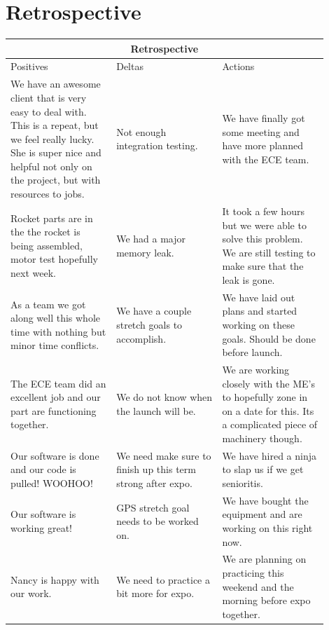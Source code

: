 \documentclass[10pt,draftclsnofoot,onecolumn]{IEEEtran}
\begin{document}
\section{Retrospective}
\begin{tabular}{ |p{0.3\linewidth}|p{0.3\linewidth}|p{0.3\linewidth}| }
\hline
\multicolumn{3}{|c|}{Retrospective} \\
\hline
    Positives & Deltas & Actions \\
\hline
    We have an awesome client that is very easy to deal with. This is a repeat, but we feel really lucky. She is super nice and helpful not only on the project, but with resources to jobs. & Not enough integration testing. & We have finally got some meeting and have more planned with the ECE team. \\
\hline
    Rocket parts are in the the rocket is being assembled, motor test hopefully next week. & We had a major memory leak. & It took a few hours but we were able to solve this problem. We are still testing to make sure that the leak is gone. \\
\hline
As a team we got along well this whole time with nothing but minor time conflicts. & We have a couple stretch goals to accomplish. & We have laid out plans and started working on these goals. Should be done before launch. \\
\hline
The ECE team did an excellent job and our part are functioning together. & We do not know when the launch will be. & We are working closely with the ME's to hopefully zone in on a date for this. Its a complicated piece of machinery though.\\
\hline
Our software is done and our code is pulled! WOOHOO! & We need make sure to finish up this term strong after expo. & We have hired a ninja to slap us if we get senioritis. \\
\hline
Our software is working great! & GPS stretch goal needs to be worked on. & We have bought the equipment and are working on this right now. \\
\hline
Nancy is happy with our work. & We need to practice a bit more for expo. & We are planning on practicing this weekend and the morning before expo together. \\
\hline

\end{tabular}
\end{document}
